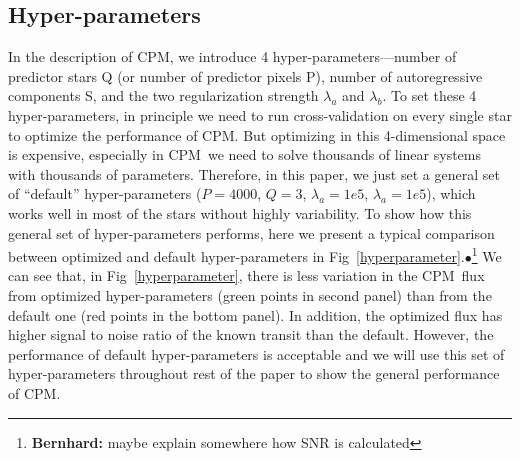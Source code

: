 \documentclass[12pt, preprint]{aastex}
\newcommand{\name}{CPM}
\newcommand{\Bernhard}[1]{$\bullet$\footnote{{\bf Bernhard:} #1}}
\begin{document}
\subsection{Hyper-parameters}
In the description of \name, 
  we introduce 4 hyper-parameters---number of predictor stars Q (or number of predictor pixels P), 
  number of autoregressive components S, and the two regularization strength $\lambda_{a}$ and $\lambda_{b}$.
To set these 4 hyper-parameters, 
  in principle we need to run cross-validation on every single star to optimize the performance of \name.
But optimizing in this 4-dimensional space is expensive, 
  especially in \name\ we need to solve thousands of linear systems with thousands of parameters. 
Therefore, in this paper, 
  we just set a general set of ``default'' hyper-parameters ($P=4000$, $Q=3$, $\lambda_a=1e5$, $\lambda_a=1e5$), 
  which works well in most of the stars without highly variability. 
To show how this general set of hyper-parameters performs, 
  here we present a typical comparison between optimized and default hyper-parameters 
  in Fig~\ref{hyperparameter}.\Bernhard{maybe explain somewhere how SNR is calculated}  
We can see that, in Fig~\ref{hyperparameter}, 
  there is less variation in the \name\ flux from optimized hyper-parameters (green points in second panel) 
  than from the default one (red points in the bottom panel). 
In addition, the optimized flux has higher signal to noise ratio of the known transit than the default. 
However, the performance of default hyper-parameters is acceptable 
  and we will use this set of hyper-parameters throughout rest of the paper 
  to show the general performance of \name.
\end{document}
